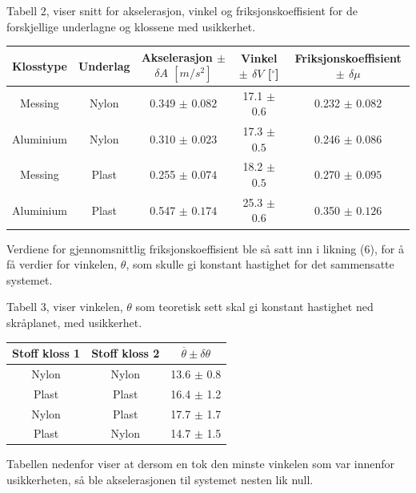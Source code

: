 \documentclass[10pt,a4paper]{report}
\begin{document}
\begin{center}
 \begin{tablenotes}
 	\small
 	\item Tabell 2, viser snitt for akselerasjon, vinkel og friksjonskoeffisient for de forskjellige underlagne og klossene med usikkerhet.
 	\end{tablenotes}
  \begin{tabular}{| c | c | c | c | c |}
    \hline
    Klosstype & Underlag & Akselerasjon $\pm$ $\delta A$ $[m/s^2]$ & Vinkel $\pm$ $\delta V$ [$^{\circ}$] & Friksjonskoeffisient $\pm$ $\delta \mu$ \\ \hline
    Messing & Nylon & 0.349 $\pm$ $0.082$ & 17.1 $\pm$ $0.6$ & 0.232 $\pm$ $0.082$ \\ \hline
    Aluminium & Nylon & 0.310 $\pm$ $0.023$ & 17.3 $\pm$ $0.5$ & 0.246 $\pm$ $0.086$\\ \hline
    Messing & Plast & 0.255 $\pm$ $0.074$ & 18.2 $\pm$ $0.5$ & 0.270 $\pm$ $0.095$\\ \hline
    Aluminium & Plast & 0.547 $\pm$ $0.174$ & 25.3 $\pm$ $0.6$ & 0.350 $\pm$ $0.126$\\ \hline
  \end{tabular}
\end{center}

Verdiene for gjennomsnittlig friksjonskoeffisient ble så satt inn i likning (6), for å få verdier for vinkelen, $\theta$, som skulle gi konstant hastighet for det sammensatte systemet.

\begin{center}
     \begin{tablenotes}
 	\small
 	\item Tabell 3, viser vinkelen, $\theta$ som teoretisk sett skal gi konstant hastighet ned skråplanet, med usikkerhet.
 	\end{tablenotes}
  \begin{tabular}{| c | c | c |}
    \hline
    Stoff kloss 1 & Stoff kloss 2 & $\overline{\theta} \pm \delta\theta$ \\ \hline
    Nylon & Nylon & 13.6 $\pm$ 0.8 \\ \hline
    Plast & Plast & 16.4 $\pm$ 1.2 \\ \hline
    Nylon & Plast & 17.7 $\pm$ 1.7 \\ \hline
    Plast & Nylon & 14.7 $\pm$ 1.5  \\ \hline
  \end{tabular}
\end{center}
Tabellen nedenfor viser at dersom en tok den minste vinkelen som var innenfor usikkerheten, så ble akselerasjonen til systemet nesten lik null.
\end{document}
